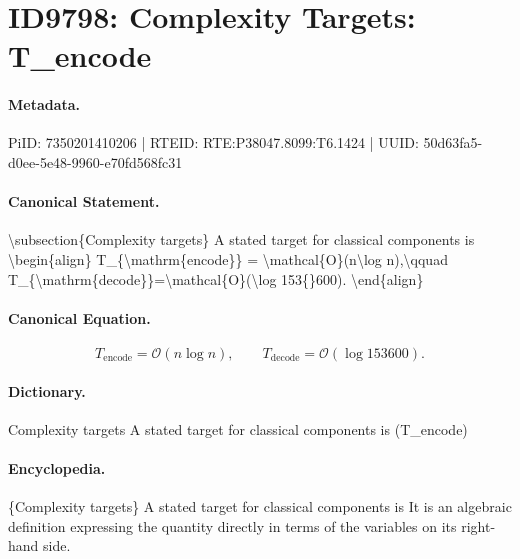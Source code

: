 \section*{ID9798: Complexity Targets: T\_encode}
\paragraph{Metadata.}
PiID: 7350201410206 | RTEID: RTE:P38047.8099:T6.1424 | UUID: 50d63fa5-d0ee-5e48-9960-e70fd568fc31

\paragraph{Canonical Statement.}
\textbackslash{}subsection\{Complexity targets\} A stated target for classical components is \textbackslash{}begin\{align\} T\_\{\textbackslash{}mathrm\{encode\}\} = \textbackslash{}mathcal\{O\}(n\textbackslash{}log n),\textbackslash{}qquad T\_\{\textbackslash{}mathrm\{decode\}\}=\textbackslash{}mathcal\{O\}(\textbackslash{}log 153\{\}600). \textbackslash{}end\{align\}

\paragraph{Canonical Equation.}
\[
T_{\mathrm{encode}} = \mathcal{O}(n\log n),\qquad T_{\mathrm{decode}}=\mathcal{O}(\log 153{}600).
\]

\paragraph{Dictionary.}
Complexity targets A stated target for classical components is (T\_encode)

\paragraph{Encyclopedia.}
\{Complexity targets\} A stated target for classical components is It is an algebraic definition expressing the quantity directly in terms of the variables on its right-hand side.
